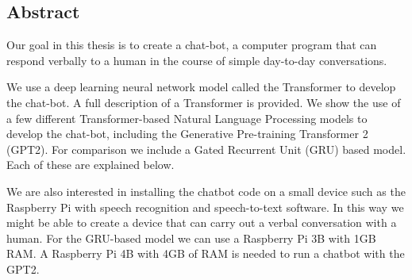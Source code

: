 
\begin{center}
	
\section*{Abstract}
\end{center}



Our goal in this thesis is to create a chat-bot, a computer program that can respond verbally to a human in the course of simple day-to-day conversations.

We use a deep learning neural network model called the Transformer to develop the chat-bot. A full description of a Transformer is provided. We show  the use of a few different Transformer-based Natural Language Processing models to develop the chat-bot, including the Generative Pre-training Transformer 2 (GPT2). For comparison we include a Gated Recurrent Unit (GRU) based model. Each of these are explained below.

We are also interested in installing the chatbot code on a small device  such as the Raspberry Pi with speech recognition and speech-to-text software. In this way we might be able to create a device that can carry out a verbal conversation with a human. For the GRU-based model we can use a Raspberry Pi 3B with 1GB RAM. A Raspberry Pi 4B with 4GB of RAM is needed to run a chatbot with the GPT2. 


